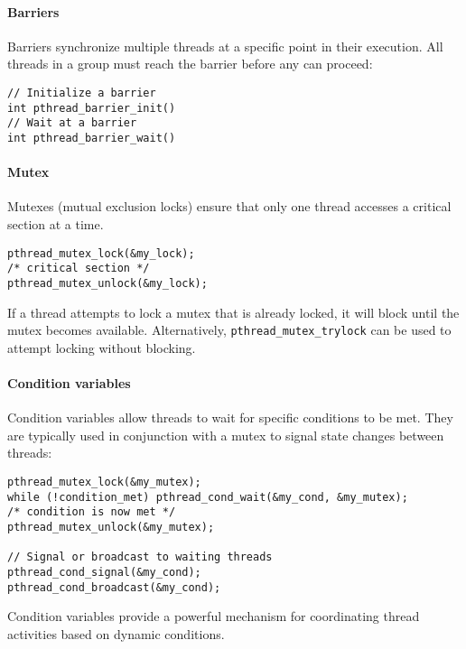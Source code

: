 \paragraph*{Barriers}
Barriers synchronize multiple threads at a specific point in their execution. 
All threads in a group must reach the barrier before any can proceed:
\begin{lstlisting}[style=C]
// Initialize a barrier
int pthread_barrier_init()
// Wait at a barrier
int pthread_barrier_wait()
\end{lstlisting}

\paragraph*{Mutex}
Mutexes (mutual exclusion locks) ensure that only one thread accesses a critical section at a time.
\begin{lstlisting}[style=C]
pthread_mutex_lock(&my_lock);
/* critical section */
pthread_mutex_unlock(&my_lock);
\end{lstlisting}
If a thread attempts to lock a mutex that is already locked, it will block until the mutex becomes available. 
Alternatively, \texttt{pthread\_mutex\_trylock} can be used to attempt locking without blocking.

\paragraph*{Condition variables}
Condition variables allow threads to wait for specific conditions to be met. 
They are typically used in conjunction with a mutex to signal state changes between threads:
\begin{lstlisting}[style=C]
pthread_mutex_lock(&my_mutex);
while (!condition_met) pthread_cond_wait(&my_cond, &my_mutex);
/* condition is now met */
pthread_mutex_unlock(&my_mutex);

// Signal or broadcast to waiting threads
pthread_cond_signal(&my_cond);
pthread_cond_broadcast(&my_cond);
\end{lstlisting}
Condition variables provide a powerful mechanism for coordinating thread activities based on dynamic conditions.